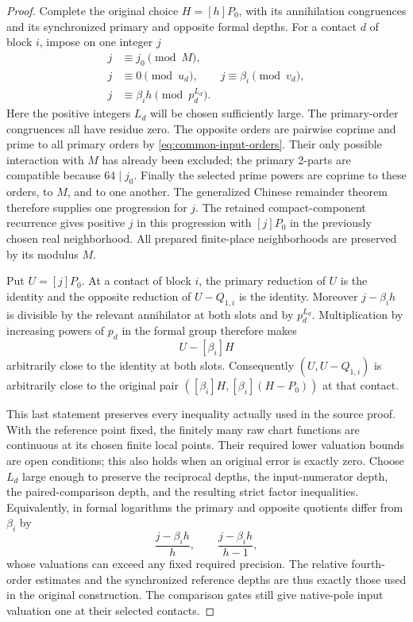 \documentclass[11pt]{article}
\begin{document}
\begin{proof}
Complete the original choice \(H=[h]P_0\), with its annihilation
congruences and its synchronized primary and opposite formal depths.
For a contact \(d\) of block \(i\), impose on one integer \(j\)
\begin{equation}\label{eq:common-input-crt}
 \begin{aligned}
 j&\equiv j_0\pmod M,\\
 j&\equiv0\pmod{u_d},\qquad
 j\equiv\beta_i\pmod{v_d},\\
 j&\equiv\beta_i h\pmod{p_d^{L_d}}.
 \end{aligned}
\end{equation}
Here the positive integers \(L_d\) will be chosen sufficiently large.
The primary-order congruences all have residue zero.  The opposite
orders are pairwise coprime and prime to all primary orders by
\eqref{eq:common-input-orders}.  Their only possible interaction with
\(M\) has already been excluded; the primary 2-parts are compatible
because \(64\mid j_0\).  Finally the selected prime powers are coprime
to these orders, to \(M\), and to one another.  The generalized Chinese
remainder theorem therefore supplies one progression for \(j\).
The retained compact-component recurrence gives positive \(j\) in this
progression with \([j]P_0\) in the previously chosen real neighborhood.
All prepared finite-place neighborhoods are preserved by its modulus
\(M\).

Put \(U=[j]P_0\).  At a contact of block \(i\), the primary reduction
of \(U\) is the identity and the opposite reduction of
\(U-Q_{1,i}\) is the identity.  Moreover \(j-\beta_i h\) is divisible
by the relevant annihilator at both slots and by \(p_d^{L_d}\).
Multiplication by increasing powers of \(p_d\) in the formal group
therefore makes
\[
                     U-[\beta_i]H
\]
arbitrarily close to the identity at both slots.  Consequently
\((U,U-Q_{1,i})\) is arbitrarily close to the original pair
\(([\beta_i]H,[\beta_i](H-P_0))\) at that contact.

This last statement preserves every inequality actually used in the
source proof.  With the reference point fixed, the finitely many raw
chart functions are continuous at its chosen finite local points.
Their required lower valuation bounds are open conditions; this
also holds when an original error is exactly zero.  Choose \(L_d\)
large enough to preserve the reciprocal depths, the input-numerator
depth, the paired-comparison depth, and the resulting strict factor
inequalities.  Equivalently, in formal logarithms the primary and
opposite quotients differ from \(\beta_i\) by
\[
       \frac{j-\beta_i h}{h},\qquad
       \frac{j-\beta_i h}{h-1},
\]
whose valuations can exceed any fixed required precision.  The
relative fourth-order estimates and the synchronized reference depths
are thus exactly those used in the original construction.  The
comparison gates still give native-pole input valuation one at their
selected contacts.


\end{proof}
\end{document}
